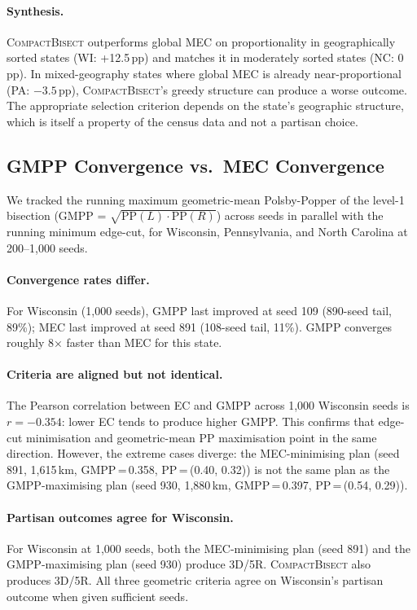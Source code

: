 \paragraph{Synthesis.}
\textsc{CompactBisect} outperforms global MEC on proportionality in geographically
sorted states (WI: +12.5\,pp) and matches it in moderately sorted states (NC:
0\,pp). In mixed-geography states where global MEC is already near-proportional
(PA: $-3.5$\,pp), \textsc{CompactBisect}'s greedy structure can produce a worse
outcome. The appropriate selection criterion depends on the state's geographic
structure, which is itself a property of the census data and not a partisan choice.

\subsection{GMPP Convergence vs.\ MEC Convergence}
\label{sec:eval:gmpp}

We tracked the running maximum geometric-mean Polsby-Popper of the level-1
bisection (GMPP = $\sqrt{\mathrm{PP}(L)\cdot\mathrm{PP}(R)}$) across seeds
in parallel with the running minimum edge-cut, for Wisconsin, Pennsylvania,
and North Carolina at 200--1{,}000 seeds.

\paragraph{Convergence rates differ.}
For Wisconsin (1{,}000 seeds), GMPP last improved at seed 109 (890-seed
tail, 89\%); MEC last improved at seed 891 (108-seed tail, 11\%). GMPP
converges roughly 8× faster than MEC for this state.

\paragraph{Criteria are aligned but not identical.}
The Pearson correlation between EC and GMPP across 1{,}000 Wisconsin seeds is
$r = -0.354$: lower EC tends to produce higher GMPP. This confirms that
edge-cut minimisation and geometric-mean PP maximisation point in the same
direction. However, the extreme cases diverge: the MEC-minimising plan
(seed 891, 1{,}615\,km, GMPP\,=\,0.358, PP\,=\,(0.40, 0.32)) is not the same
plan as the GMPP-maximising plan (seed 930, 1{,}880\,km, GMPP\,=\,0.397,
PP\,=\,(0.54, 0.29)).

\paragraph{Partisan outcomes agree for Wisconsin.}
For Wisconsin at 1{,}000 seeds, both the MEC-minimising plan (seed 891) and the
GMPP-maximising plan (seed 930) produce 3D/5R. \textsc{CompactBisect} also
produces 3D/5R. All three geometric criteria agree on Wisconsin's partisan
outcome when given sufficient seeds.

